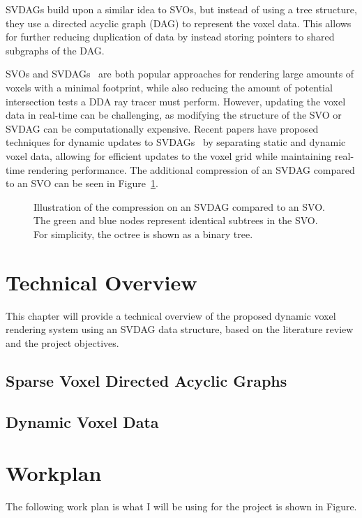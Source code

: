 \documentclass{article}
\begin{document}
SVDAGs build upon a similar idea to SVOs, but instead of using a tree structure, they use a directed acyclic graph (DAG) to represent the voxel data. This allows for further reducing duplication of data by instead storing pointers to shared subgraphs of the DAG.

SVOs and SVDAGs~\cite{Kampe_Sintorn_Assarsson} are both popular approaches for rendering large amounts of voxels with a minimal footprint, while also reducing the amount of potential intersection tests a DDA ray tracer must perform. However, updating the voxel data in real-time can be challenging, as modifying the structure of the SVO or SVDAG can be computationally expensive. Recent papers have proposed techniques for dynamic updates to SVDAGs~\cite{Careil_Billeter_Eisemann_2020} by separating static and dynamic voxel data, allowing for efficient updates to the voxel grid while maintaining real-time rendering performance. The additional compression of an SVDAG compared to an SVO can be seen in Figure~\ref{fig:svdag}.

\begin{figure}[thp]
    \begin{center}
    \end{center}
    \caption{Illustration of the compression on an SVDAG compared to an SVO. The green and blue nodes represent identical subtrees in the SVO. For simplicity, the octree is shown as a binary tree.}
    \label{fig:svdag}
\end{figure}

\section{Technical Overview}
This chapter will provide a technical overview of the proposed dynamic voxel rendering system using an SVDAG data structure, based on the literature review and the project objectives.

\subsection{Sparse Voxel Directed Acyclic Graphs}

\subsection{Dynamic Voxel Data}

\section{Workplan}
The following work plan is what I will be using for the project is shown in Figure.



\end{document}
